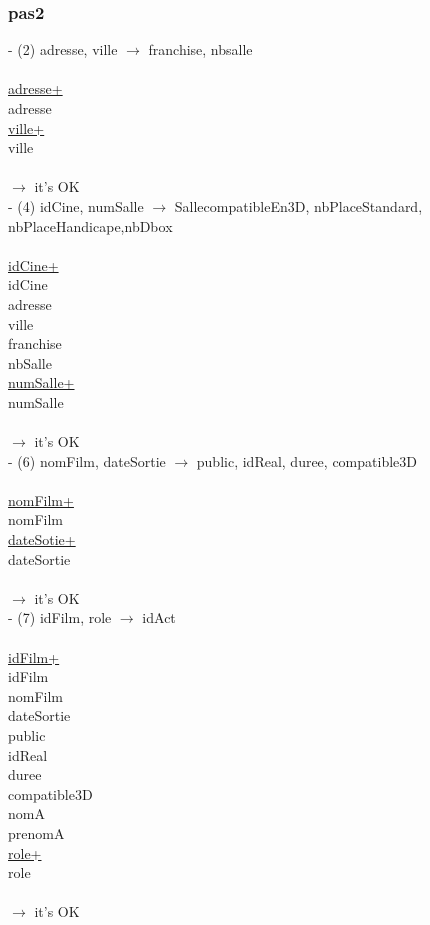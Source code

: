 \documentclass[a4paper,sffamily,12pt]{article}
\begin{document}
					\subsubsection{pas2}
		
						\noindent - (2) adresse, ville $\rightarrow$ franchise, nbsalle \\
							\\
							\underline{adresse+} \\
							adresse \\
							\underline{ville+} \\
							ville \\
							\\
						$\rightarrow$ it's OK \\
		
						\noindent - (4) idCine, numSalle $\rightarrow$ SallecompatibleEn3D, nbPlaceStandard, nbPlaceHandicape,nbDbox \\
							\\
							\underline{idCine+} \\
							idCine \\
							adresse \\
							ville \\
							franchise \\
							nbSalle \\
							\underline{numSalle+} \\
							numSalle \\
							\\
						$\rightarrow$ it's OK \\
						
						\noindent - (6) nomFilm, dateSortie $\rightarrow$ public, idReal, duree, compatible3D \\																						\\
							\underline{nomFilm+} \\
							nomFilm \\
							\underline{dateSotie+} \\
							dateSortie \\
							\\
						$\rightarrow$ it's OK \\
					
						\noindent - (7) idFilm, role $\rightarrow$  idAct \\
							\\
							\underline{idFilm+} \\
							idFilm \\
							nomFilm \\
							dateSortie \\
							public \\
							idReal \\
							duree \\
							compatible3D \\
							nomA \\
							prenomA \\
							\underline{role+} \\
							role \\
							\\
						$\rightarrow$ it's OK \\
							
\end{document}
